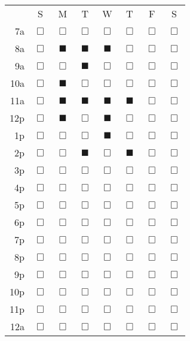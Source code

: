 \documentclass{article}
\begin{document}
\begin{table}
\centering
\begin{tabular}{rccccccc}
     & S & M & T & W & T & F & S \\
7a & $\Box$ & $\Box$ & $\Box$ & $\Box$ & $\Box$ & $\Box$ & $\Box$ \\
8a & $\Box$ & $\blacksquare$ & $\blacksquare$ & $\blacksquare$ & $\Box$ & $\Box$ & $\Box$ \\
9a & $\Box$ & $\Box$ & $\blacksquare$ & $\Box$ & $\Box$ & $\Box$ & $\Box$ \\
10a & $\Box$ & $\blacksquare$ & $\Box$ & $\Box$ & $\Box$ & $\Box$ & $\Box$ \\
11a & $\Box$ & $\blacksquare$ & $\blacksquare$ & $\blacksquare$ & $\blacksquare$ & $\Box$ & $\Box$ \\
12p & $\Box$ & $\blacksquare$ & $\Box$ & $\blacksquare$ & $\Box$ & $\Box$ & $\Box$ \\
1p & $\Box$ & $\Box$ & $\Box$ & $\blacksquare$ & $\Box$ & $\Box$ & $\Box$ \\
2p & $\Box$ & $\Box$ & $\blacksquare$ & $\Box$ & $\blacksquare$ & $\Box$ & $\Box$ \\
3p & $\Box$ & $\Box$ & $\Box$ & $\Box$ & $\Box$ & $\Box$ & $\Box$ \\
4p & $\Box$ & $\Box$ & $\Box$ & $\Box$ & $\Box$ & $\Box$ & $\Box$ \\
5p & $\Box$ & $\Box$ & $\Box$ & $\Box$ & $\Box$ & $\Box$ & $\Box$ \\
6p & $\Box$ & $\Box$ & $\Box$ & $\Box$ & $\Box$ & $\Box$ & $\Box$ \\
7p & $\Box$ & $\Box$ & $\Box$ & $\Box$ & $\Box$ & $\Box$ & $\Box$ \\
8p & $\Box$ & $\Box$ & $\Box$ & $\Box$ & $\Box$ & $\Box$ & $\Box$ \\
9p & $\Box$ & $\Box$ & $\Box$ & $\Box$ & $\Box$ & $\Box$ & $\Box$ \\
10p & $\Box$ & $\Box$ & $\Box$ & $\Box$ & $\Box$ & $\Box$ & $\Box$ \\
11p & $\Box$ & $\Box$ & $\Box$ & $\Box$ & $\Box$ & $\Box$ & $\Box$ \\
12a & $\Box$ & $\Box$ & $\Box$ & $\Box$ & $\Box$ & $\Box$ & $\Box$
\end{tabular}
\end{table}
\end{document}
